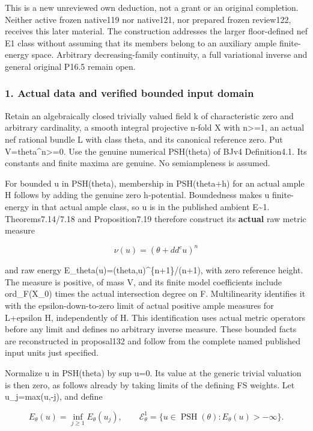 \documentclass[
]{article}
\begin{document}
This is a new unreviewed own deduction, not a grant or an original
completion. Neither active frozen native119 nor native121, nor prepared
frozen review122, receives this later material. The construction
addresses the larger floor-defined nef E1 class without assuming that
its members belong to an auxiliary ample finite-energy space. Arbitrary
decreasing-family continuity, a full variational inverse and general
original P16.5 remain open.

\subsubsection{1. Actual data and verified bounded input
domain}\label{actual-data-and-verified-bounded-input-domain}

Retain an algebraically closed trivially valued field k of
characteristic zero and arbitrary cardinality, a smooth integral
projective n-fold X with n\textgreater=1, an actual nef rational bundle
L with class theta, and its canonical reference zero. Put
V=theta\^{}n\textgreater=0. Use the genuine numerical PSH(theta) of BJv4
Definition4.1. Its constants and finite maxima are genuine. No
semiampleness is assumed.

For bounded u in PSH(theta), membership in PSH(theta+h) for an actual
ample H follows by adding the genuine zero h-potential. Boundedness
makes u finite-energy in that actual ample class, so u is in the
published ambient E\textasciitilde1. Theorems7.14/7.18 and
Proposition7.19 therefore construct its \textbf{actual} raw metric
measure

\[\nu(u)=(\theta+dd^cu)^n\]

and raw energy E\_theta(u)=(theta,u)\^{}\{n+1\}/(n+1), with zero
reference height. The measure is positive, of mass V, and its finite
model coefficients include ord\_F(X\_0) times the actual intersection
degree on F. Multilinearity identifies it with the epsilon-down-to-zero
limit of actual positive ample measures for L+epsilon H, independently
of H. This identification uses actual metric operators before any limit
and defines no arbitrary inverse measure. These bounded facts are
reconstructed in proposal132 and follow from the complete named
published input units just specified.

Normalize u in PSH(theta) by sup u=0. Its value at the generic trivial
valuation is then zero, as follows already by taking limits of the
defining FS weights. Let u\_j=max(u,-j), and define

\[E_\theta(u)=\inf_{j\geq1}E_\theta(u_j),\qquad
\mathcal E^1_\theta=\{u\in\operatorname{PSH}(\theta):E_\theta(u)>-\infty\}.\]
\end{document}

